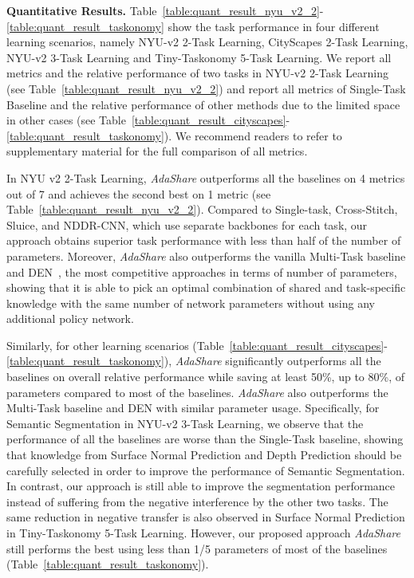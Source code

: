 \textbf{Quantitative Results.} 
Table~\ref{table:quant_result_nyu_v2_2}-\ref{table:quant_result_taskonomy} show the task performance in four different learning scenarios, namely NYU-v2 2-Task Learning, CityScapes 2-Task Learning, NYU-v2 3-Task Learning and Tiny-Taskonomy 5-Task Learning. We report all metrics and the relative performance of two tasks in NYU-v2 2-Task Learning (see Table~\ref{table:quant_result_nyu_v2_2}) and  report all metrics of Single-Task Baseline
and the relative performance of other methods due to the limited space in other cases (see Table~\ref{table:quant_result_cityscapes}-\ref{table:quant_result_taskonomy}). We recommend readers to refer to supplementary material for the full comparison of all metrics.

In NYU v2 2-Task Learning, \textit{AdaShare} outperforms all the baselines on 4 metrics out of 7 and achieves the second best on 1 metric (see Table~\ref{table:quant_result_nyu_v2_2}). Compared to Single-task, Cross-Stitch, Sluice, and NDDR-CNN, which use separate backbones for each task, our approach obtains superior task performance {with less than half of the number of parameters}. Moreover, \textit{AdaShare} also outperforms the vanilla Multi-Task baseline and DEN~\cite{ahn2019deep}, the most competitive approaches in terms of number of parameters, showing that it is able to pick an optimal combination of shared and task-specific knowledge with the same number of network parameters without using any additional policy network. 

Similarly, for other learning scenarios (Table~\ref{table:quant_result_cityscapes}-\ref{table:quant_result_taskonomy}), \textit{AdaShare} significantly outperforms all the baselines on overall relative performance while saving at least 50\%, up to 80\%, of parameters compared to most of the baselines.
\textit{AdaShare} also outperforms the Multi-Task baseline and DEN with similar parameter usage. Specifically, for Semantic Segmentation in NYU-v2 3-Task Learning, we observe that the performance of all the baselines are worse than the Single-Task baseline, showing that knowledge from Surface Normal Prediction and Depth Prediction should be carefully selected in order to improve the performance of Semantic Segmentation. In contrast, our approach is still able to improve the segmentation performance instead of suffering from the negative interference by the other two tasks. The same reduction in negative transfer is also observed in Surface Normal Prediction in Tiny-Taskonomy 5-Task Learning. However, our proposed approach \textit{AdaShare} still performs the best using less than 1/5 parameters of most of the baselines (Table~\ref{table:quant_result_taskonomy}).  

